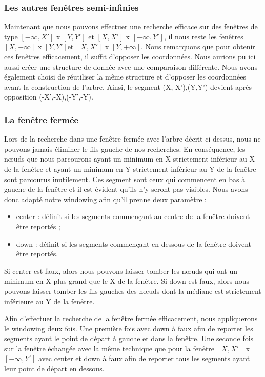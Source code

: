 \documentclass[10pt,a4paper]{article}
\begin{document}
\subsubsection{Les autres fenêtres semi-infinies}
Maintenant que nous pouvons effectuer une recherche efficace sur des fenêtres de type $[-\infty, X']$ x $[Y, Y']$ et $[X, X']$ x $[-\infty, Y']$, il nous reste les fenêtres $[X, +\infty]$ x $[Y, Y']$et $[X, X']$ x $[Y, +\infty]$. Nous remarquons que pour obtenir ces fenêtres efficacement, il suffit d'opposer les coordonnées. Nous aurions pu ici aussi créer une structure de donnée avec une comparaison différente. Nous avons également choisi de réutiliser la même structure et d'opposer les coordonnées avant la construction de l'arbre. Ainsi, le segment (X, X'),(Y,Y') devient après opposition (-X',-X),(-Y',-Y).

\subsubsection{La fenêtre fermée}
Lors de la recherche dans une fenêtre fermée avec l'arbre décrit ci-dessus, nous ne pouvons jamais éliminer le fils gauche de nos recherches. En conséquence, les nœuds que nous parcourons ayant un minimum en X strictement inférieur au X de la fenêtre et ayant un minimum en Y strictement inférieur au Y de la fenêtre sont parcourus inutilement. Ces segment sont ceux qui commencent en bas à gauche de la fenêtre et il est évident qu'ils n'y seront pas visibles. Nous avons donc adapté notre windowing afin qu'il prenne deux paramètre :
\begin{itemize}
	\item center : définit si les segments commençant au centre de la fenêtre doivent être reportés ;
	\item down : définit si les segments commençant en dessous de la fenêtre doivent être reportés.
\end{itemize}
Si center est faux, alors nous pouvons laisser tomber les nœuds qui ont un minimum en X plus grand que le X de la fenêtre.
Si down est faux, alors nous pouvons laisser tomber les fils gauches des nœuds dont la médiane est strictement inférieure au Y de la fenêtre.

Afin d'effectuer la recherche de la fenêtre fermée efficacement, nous appliquerons le windowing deux fois. Une première fois avec down à faux afin de reporter les segments ayant le point de départ à gauche et dans la fenêtre. Une seconde fois sur la fenêtre échangée avec la même technique que pour la fenêtre $[X, X']$ x $[-\infty, Y']$ avec center et down à faux afin de reporter tous les segments ayant leur point de départ en dessous.
\end{document}
